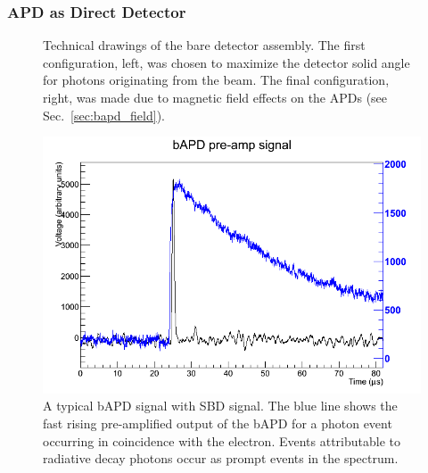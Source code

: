 \documentclass[oneside,12pt]{memoir}
\begin{document}
\subsubsection{APD as Direct Detector}
\label{sec:direct}
\begin{figure}[t]
	\centering
	\caption[Bare detector assembly.]{Technical drawings of the bare detector assembly. The first configuration, left, was chosen to maximize the detector solid angle for photons originating from the beam. The final configuration, right, was made due to magnetic field effects on the APDs (see Sec.~\ref{sec:bapd_field}).}
	\label{fig:bapd}
\end{figure}
\begin{figure}[t]
	\includegraphics[width=\textwidth]{bAPD_waveform.png}
	\caption[A typical bAPD signal with SBD signal.]{A typical bAPD signal with SBD signal. The blue line shows the fast rising pre-amplified output of the bAPD for a photon event occurring in coincidence with the electron. Events attributable to radiative decay photons occur as prompt events in the spectrum.}
	\label{fig:bapd_signal_ch3}
\end{figure}
\end{document}
